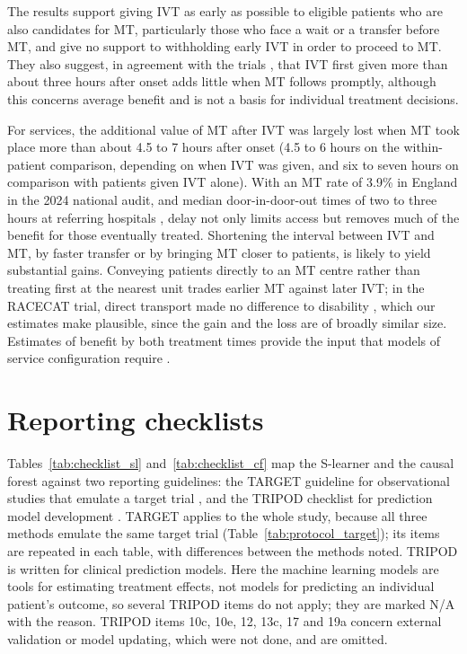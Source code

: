 The results support giving IVT as early as possible to eligible patients who are also candidates for MT, particularly those who face a wait or a transfer before MT, and give no support to withholding early IVT in order to proceed to MT. They also suggest, in agreement with the trials , that IVT first given more than about three hours after onset adds little when MT follows promptly, although this concerns average benefit and is not a basis for individual treatment decisions.

For services, the additional value of MT after IVT was largely lost when MT took place more than about 4.5 to 7 hours after onset (4.5 to 6 hours on the within-patient comparison, depending on when IVT was given, and six to seven hours on comparison with patients given IVT alone). With an MT rate of 3.9\% in England in the 2024 national audit, and median door-in-door-out times of two to three hours at referring hospitals , delay not only limits access but removes much of the benefit for those eventually treated. Shortening the interval between IVT and MT, by faster transfer or by bringing MT closer to patients, is likely to yield substantial gains. Conveying patients directly to an MT centre rather than treating first at the nearest unit trades earlier MT against later IVT; in the RACECAT trial, direct transport made no difference to disability , which our estimates make plausible, since the gain and the loss are of broadly similar size. Estimates of benefit by both treatment times provide the input that models of service configuration require .



\newpage

\section{Reporting checklists}\label{sec:checklists}

\providecommand{\stok}{\textcolor{green!50!black}{Reported}}
\providecommand{\stpart}{\textcolor{orange!85!black}{\textbf{Partly}}}
\providecommand{\stgap}{\textcolor{red}{\textbf{Gap}}}
\providecommand{\stna}{\textcolor{gray}{N/A}}

Tables~\ref{tab:checklist_sl} and~\ref{tab:checklist_cf} map the S-learner and the causal forest against two reporting guidelines: the TARGET guideline for observational studies that emulate a target trial , and the TRIPOD checklist for prediction model development . TARGET applies to the whole study, because all three methods emulate the same target trial (Table~\ref{tab:protocol_target}); its items are repeated in each table, with differences between the methods noted. TRIPOD is written for clinical prediction models. Here the machine learning models are tools for estimating treatment effects, not models for predicting an individual patient's outcome, so several TRIPOD items do not apply; they are marked N/A with the reason. TRIPOD items 10c, 10e, 12, 13c, 17 and 19a concern external validation or model updating, which were not done, and are omitted.

